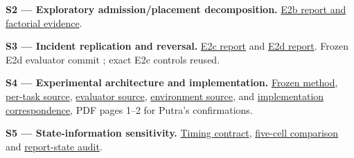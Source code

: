 \documentclass[12pt,a4paper]{article}
\begin{document}
\label{source-s2}

\textbf{S2 --- Exploratory admission/placement decomposition.} \href{\detokenize{../../evaluation/vec_followup_2026-09-07/historical_e0_e2d/experiments/E2b/README.md}}{E2b report and factorial evidence}.

\label{source-s3}

\textbf{S3 --- Incident replication and reversal.} \href{\detokenize{../../evaluation/vec_followup_2026-09-07/historical_e0_e2d/experiments/E2c/README.md}}{E2c report} and \href{\detokenize{../../evaluation/vec_followup_2026-09-07/historical_e0_e2d/experiments/E2d/README.md}}{E2d report}. Frozen E2d evaluator commit ; exact E2c controls reused.

\label{source-s4}

\textbf{S4 --- Experimental architecture and implementation.} \href{\detokenize{../../evaluation/vec_followup_2026-09-07/historical_e0_e2d/docs/METHODOLOGY.md}}{Frozen method}, \href{\detokenize{../../evaluation/vec_followup_2026-09-07/frozen_evaluator/eval/e2d_per_task_placement.py}}{per-task source}, \href{\detokenize{../../evaluation/vec_followup_2026-09-07/frozen_evaluator/eval/eval_sumo_stage1_mc.py}}{evaluator source}, \href{\detokenize{../empirical_extension_2026-09-08/experimental/vendor/vec_jax.py}}{environment source}, and \href{\detokenize{../../correspondence/sandra_randy_vec_progress_email_thread_2026-08-18.md}}{implementation correspondence}, PDF pages 1--2 for Putra's confirmations.

\label{source-s5}

\textbf{S5 --- State-information sensitivity.} \href{\detokenize{../../evaluation/vec_followup_2026-09-07/frozen_evaluator/docs/RSU_STATE_DELAY.md}}{Timing contract}, \href{\detokenize{../../evaluation/vec_followup_2026-09-07/state-delay-pilot-2026-09-07/comparison.csv}}{five-cell comparison} and \href{\detokenize{../../evaluation/vec_followup_2026-09-07/state-delay-pilot-2026-09-07/mechanism_audit.json}}{report-state audit}.
\end{document}
